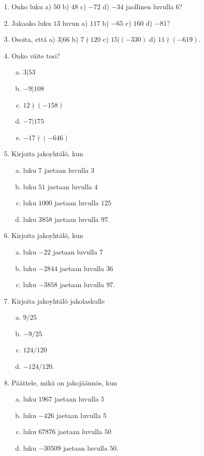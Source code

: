 \begin{enumerate}

\item Onko luku a) $50$ b) $48$ c) $-72$ d) $-34$ jaollinen luvulla $6$?

\item Jakaako luku $13$ luvun a) $117$ b) $-65$ c) $160$ d) $-81$?

\item Osoita, että a) $3|66$ b) $7\nmid 120$ c) $15|(-330)$ d) $11\nmid (-619)$.

\item Onko väite tosi?
\begin{enumerate}[a)]
\item $3|53$
\item $-9|108$
\item $12 \nmid (-158)$
\item $-7|175$
\item $-17 \nmid (-646)$
\end{enumerate}

\item Kirjoita jakoyhtälö, kun
\begin{enumerate}[a)]
\item luku $7$ jaetaan luvulla $3$
\item luku $51$ jaetaan luvulla $4$
\item luku $1000$ jaetaan luvulla $125$
\item luku $3858$ jaetaan luvulla $97$.
\end{enumerate}

\item Kirjoita jakoyhtälö, kun
\begin{enumerate}[a)]
\item luku $-22$ jaetaan luvulla $7$
\item luku $-2844$ jaetaan luvulla $36$
\item luku $-3858$ jaetaan luvulla $97$.
\end{enumerate}

\item Kirjoita jakoyhtälö jakolaskulle
\begin{enumerate}[a)]
\item $9/25$
\item $-9/25$
\item $124/120$
\item $-124/120$.
\end{enumerate}

\item Päättele, mikä on jakojäännös, kun
\begin{enumerate}[a)]
\item luku $1967$ jaetaan luvulla $5$
\item luku $-426$ jaetaan luvulla $5$
\item luku $67876$ jaetaan luvulla $50$
\item luku $-30509$ jaetaan luvulla $50$.
\end{enumerate}


\end{enumerate}
